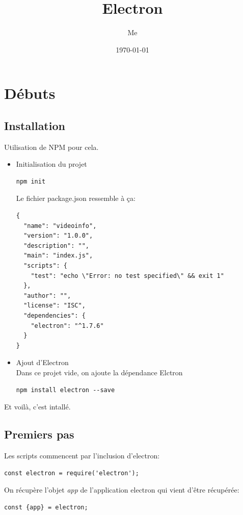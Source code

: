 \documentclass[12pt,oneside]{scrbook}
\title{Electron}
\author{Me}
\date{\today}
\begin{document}
 
\maketitle 
\tableofcontents



\chapter{Débuts}
\section{Installation}
Utilisation de NPM pour cela.
\begin{itemize}
\item Initialisation du projet
\begin{verbatim}
npm init
\end{verbatim}
Le fichier package.json ressemble à ça:
\begin{verbatim}
{
  "name": "videoinfo",
  "version": "1.0.0",
  "description": "",
  "main": "index.js",
  "scripts": {
    "test": "echo \"Error: no test specified\" && exit 1"
  },
  "author": "",
  "license": "ISC",
  "dependencies": {
    "electron": "^1.7.6"
  }
}
\end{verbatim}
\item Ajout d'Electron\\
Dans ce projet vide, on ajoute la dépendance Elctron
\begin{verbatim}
npm install electron --save
\end{verbatim}

\end{itemize}
Et voilà, c'est intallé.

\section{Premiers pas}
Les scripts commencent par l'inclusion d'electron:
\begin{verbatim}
const electron = require('electron');
\end{verbatim}
On récupère l'objet \textit{app} de l'application electron qui vient d'être récupérée:
\begin{verbatim}
const {app} = electron;
\end{verbatim}
\end{document}
